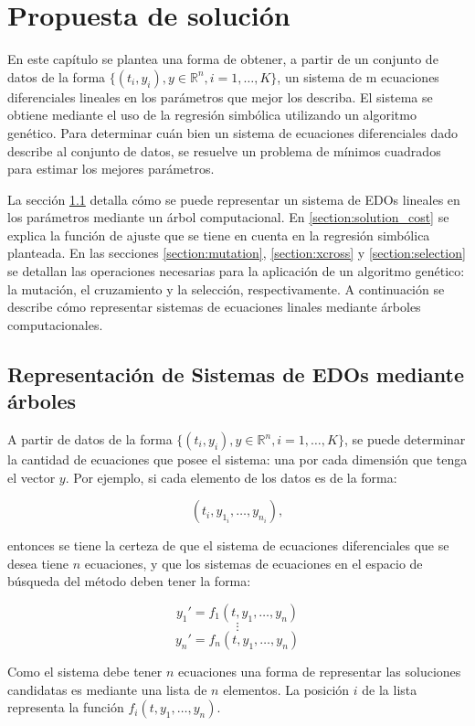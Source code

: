 \chapter{Propuesta de solución}\label{chapter:solution_proposal}

En este capítulo se plantea una forma de obtener, a partir de un conjunto de datos de la forma $\{(t_i, y_i), y \in \mathbb{R}^n, i = 1, \dots, K\}$, un sistema de m ecuaciones diferenciales lineales en los parámetros que mejor los describa. El sistema se obtiene mediante el uso de la regresión simbólica utilizando un algoritmo genético. Para determinar cuán bien un sistema de ecuaciones diferenciales dado describe al conjunto de datos, se resuelve un problema de mínimos cuadrados para estimar los mejores parámetros.

La sección \ref{section:solution_representation} detalla cómo se puede representar un sistema de EDOs lineales en los parámetros mediante un árbol computacional. En \ref{section:solution_cost} se explica la función de ajuste que se tiene en cuenta en la regresión simbólica planteada. En las secciones \ref{section:mutation}, \ref{section:xcross} y \ref{section:selection} se detallan las operaciones necesarias para la aplicación de un algoritmo genético: la mutación, el cruzamiento y la selección, respectivamente. A continuación se describe cómo representar sistemas de ecuaciones linales mediante árboles computacionales.


\section{Representación de Sistemas de EDOs mediante árboles}\label{section:solution_representation}

A partir de datos de la forma $\{(t_i, y_i), y \in \mathbb{R}^n, i = 1, \dots, K\}$, se puede determinar la cantidad de ecuaciones que posee el sistema: una por cada dimensión que tenga el vector $y$. Por ejemplo, si cada elemento de los datos es de la forma:

$$(t_i, y_{1_i}, \dots, y_{n_i}),$$

entonces se tiene la certeza de que el sistema de ecuaciones diferenciales que se desea tiene $n$ ecuaciones, y que los sistemas de ecuaciones en el espacio de búsqueda del método deben tener la forma:

$$y_1' = f_1(t, y_1, \dots, y_n)$$
$$\vdots$$
$$y_n' = f_n(t, y_1, \dots, y_n)$$

Como el sistema debe tener $n$ ecuaciones una forma de representar las soluciones candidatas es mediante una lista de $n$ elementos. La posición $i$ de la lista representa la función $f_i(t,y_1, \dots, y_n)$.

